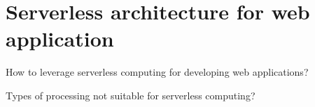 \chapter{Serverless architecture for web application}

How to leverage serverless computing for developing web applications?

Types of processing not suitable for serverless computing?